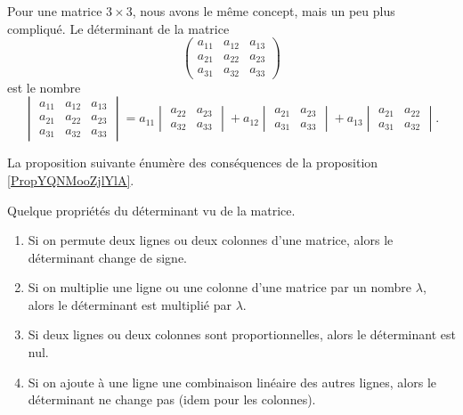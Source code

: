 Pour une matrice $3\times 3$, nous avons le même concept, mais un peu plus compliqué. Le déterminant de la matrice
\begin{equation}
    \begin{pmatrix}
        a_{11}    &   a_{12}    &   a_{13}    \\
        a_{21}    &   a_{22}    &   a_{23}    \\
        a_{31}    &   a_{32}    &   a_{33}    
    \end{pmatrix}
\end{equation}
est le nombre
\begin{equation}
    \begin{vmatrix}
        a_{11}    &   a_{12}    &   a_{13}    \\
        a_{21}    &   a_{22}    &   a_{23}    \\
        a_{31}    &   a_{32}    &   a_{33}    
    \end{vmatrix}=
    a_{11}\begin{vmatrix}
        a_{22}  &   a_{23}    \\ 
        a_{32}    &   a_{33}    
    \end{vmatrix}+
    a_{12}\begin{vmatrix}
        a_{21}  &   a_{23}    \\ 
        a_{31}    &   a_{33}
    \end{vmatrix}+
    a_{13}\begin{vmatrix}
        a_{21}  &   a_{22}    \\ 
        a_{31}    &   a_{32}
    \end{vmatrix}.
\end{equation}


La proposition suivante énumère des conséquences de la proposition \ref{PropYQNMooZjlYlA}.
\begin{proposition}
    Quelque propriétés du déterminant vu de la matrice.
    \begin{enumerate}
        \item
            Si on permute deux lignes ou deux colonnes d'une matrice, alors le déterminant change de signe.
        \item
            Si on multiplie une ligne ou une colonne d'une matrice par un nombre $\lambda$, alors le déterminant est multiplié par $\lambda$.
        \item
            Si deux lignes ou deux colonnes sont proportionnelles, alors le déterminant est nul.
        \item
            Si on ajoute à une ligne une combinaison linéaire des autres lignes, alors le déterminant ne change pas (idem pour les colonnes).
    \end{enumerate}
\end{proposition}

